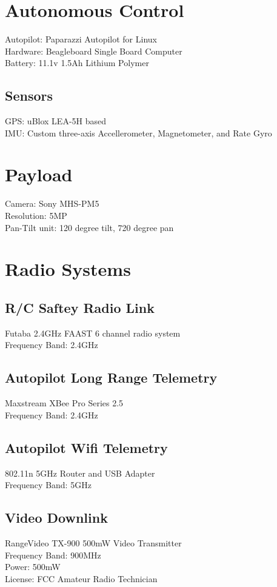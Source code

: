 \documentclass[10pt]{article}
\begin{document}
\begin{multicols}{2}
\section{Autonomous Control}
Autopilot: Paparazzi Autopilot for Linux
\\Hardware: Beagleboard Single Board Computer
\\Battery: 11.1v 1.5Ah Lithium Polymer
\subsection{Sensors}
GPS: uBlox LEA-5H based 
\\IMU: Custom three-axis Accellerometer, Magnetometer, and Rate Gyro

\section{Payload}
Camera: Sony MHS-PM5
\\Resolution: 5MP
\\Pan-Tilt unit: 120 degree tilt, 720 degree pan

\section{Radio Systems}
\subsection{R/C Saftey Radio Link}
Futaba 2.4GHz FAAST 6 channel radio system
\\Frequency Band: 2.4GHz
\subsection{Autopilot Long Range Telemetry}
Maxstream XBee Pro Series 2.5
\\Frequency Band: 2.4GHz
\subsection{Autopilot Wifi Telemetry}
802.11n 5GHz Router and USB Adapter
\\Frequency Band: 5GHz
\subsection{Video Downlink}
RangeVideo TX-900 500mW Video Transmitter
\\Frequency Band: 900MHz
\\Power: 500mW
\\License: FCC Amateur Radio Technician

\end{multicols}
\end{document}
